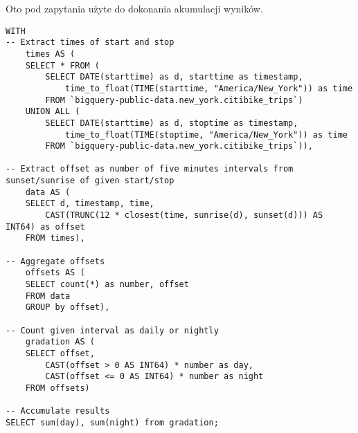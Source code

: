 \documentclass{article}
\begin{document}
\newpage
Oto pod zapytania użyte do dokonania akumulacji wyników.
\begin{verbatim}
WITH   
-- Extract times of start and stop
    times AS (
    SELECT * FROM (
        SELECT DATE(starttime) as d, starttime as timestamp, 
            time_to_float(TIME(starttime, "America/New_York")) as time 
        FROM `bigquery-public-data.new_york.citibike_trips`)
    UNION ALL (
        SELECT DATE(starttime) as d, stoptime as timestamp, 
            time_to_float(TIME(stoptime, "America/New_York")) as time 
        FROM `bigquery-public-data.new_york.citibike_trips`)),
  
-- Extract offset as number of five minutes intervals from sunset/sunrise of given start/stop  
    data AS (
    SELECT d, timestamp, time, 
        CAST(TRUNC(12 * closest(time, sunrise(d), sunset(d))) AS INT64) as offset
    FROM times),

-- Aggregate offsets
    offsets AS (
    SELECT count(*) as number, offset
    FROM data
    GROUP by offset),
  
-- Count given interval as daily or nightly
    gradation AS ( 
    SELECT offset, 
        CAST(offset > 0 AS INT64) * number as day, 
        CAST(offset <= 0 AS INT64) * number as night
    FROM offsets)
    
-- Accumulate results    
SELECT sum(day), sum(night) from gradation;
\end{verbatim}
\end{document}
